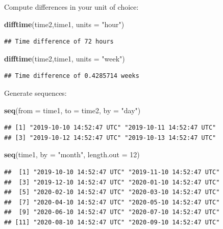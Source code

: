 \documentclass[]{book}
\newenvironment{Shaded}{\begin{snugshade}}{\end{snugshade}}
\newcommand{\DataTypeTok}[1]{\textcolor[rgb]{0.13,0.29,0.53}{#1}}
\newcommand{\DecValTok}[1]{\textcolor[rgb]{0.00,0.00,0.81}{#1}}
\newcommand{\KeywordTok}[1]{\textcolor[rgb]{0.13,0.29,0.53}{\textbf{#1}}}
\newcommand{\NormalTok}[1]{#1}
\newcommand{\StringTok}[1]{\textcolor[rgb]{0.31,0.60,0.02}{#1}}
\theoremstyle{definition}
\theoremstyle{definition}
\theoremstyle{definition}
\theoremstyle{remark}
\begin{document}
Compute differences in your unit of choice:

\begin{Shaded}
\begin{Highlighting}[]
\KeywordTok{difftime}\NormalTok{(time2,time1, }\DataTypeTok{units =}  \StringTok{"hour"}\NormalTok{)}
\end{Highlighting}
\end{Shaded}

\begin{verbatim}
## Time difference of 72 hours
\end{verbatim}

\begin{Shaded}
\begin{Highlighting}[]
\KeywordTok{difftime}\NormalTok{(time2,time1, }\DataTypeTok{units =}  \StringTok{"week"}\NormalTok{)}
\end{Highlighting}
\end{Shaded}

\begin{verbatim}
## Time difference of 0.4285714 weeks
\end{verbatim}

Generate sequences:

\begin{Shaded}
\begin{Highlighting}[]
\KeywordTok{seq}\NormalTok{(}\DataTypeTok{from =}\NormalTok{ time1, }\DataTypeTok{to =}\NormalTok{ time2, }\DataTypeTok{by =} \StringTok{"day"}\NormalTok{) }
\end{Highlighting}
\end{Shaded}

\begin{verbatim}
## [1] "2019-10-10 14:52:47 UTC" "2019-10-11 14:52:47 UTC"
## [3] "2019-10-12 14:52:47 UTC" "2019-10-13 14:52:47 UTC"
\end{verbatim}

\begin{Shaded}
\begin{Highlighting}[]
\KeywordTok{seq}\NormalTok{(time1, }\DataTypeTok{by =} \StringTok{"month"}\NormalTok{, }\DataTypeTok{length.out =} \DecValTok{12}\NormalTok{)}
\end{Highlighting}
\end{Shaded}

\begin{verbatim}
##  [1] "2019-10-10 14:52:47 UTC" "2019-11-10 14:52:47 UTC"
##  [3] "2019-12-10 14:52:47 UTC" "2020-01-10 14:52:47 UTC"
##  [5] "2020-02-10 14:52:47 UTC" "2020-03-10 14:52:47 UTC"
##  [7] "2020-04-10 14:52:47 UTC" "2020-05-10 14:52:47 UTC"
##  [9] "2020-06-10 14:52:47 UTC" "2020-07-10 14:52:47 UTC"
## [11] "2020-08-10 14:52:47 UTC" "2020-09-10 14:52:47 UTC"
\end{verbatim}
\end{document}
